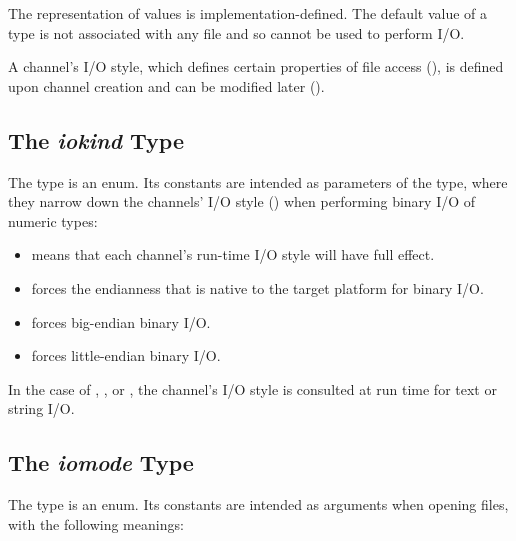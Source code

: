The representation of  values is implementation-defined.
The default value of a  type is not associated
with any file and so cannot be used to perform I/O.

A channel's I/O style,
which defines certain properties of file access (),
is defined upon channel creation and can be modified later
().


\subsection{The {\em iokind} Type}
\label{IO_iokind_type}

The  type is an enum. Its constants are intended
as parameters of the  type,
where they narrow down the channels' I/O style ()
when performing binary I/O of numeric types:

\begin{itemize}

\item {} means that each channel's run-time I/O style will
      have full effect.      

\item {} forces the endianness that is native
      to the target platform for binary I/O.

\item {} forces big-endian binary I/O.

\item {} forces little-endian binary I/O.

\end{itemize}

In the case of , , or ,
the channel's I/O style is consulted at run time for
text or string I/O.


\subsection{The {\em iomode} Type}
\label{IO_iomode_type}

The  type is an enum. Its constants are intended
as arguments when opening files, with the following meanings:

